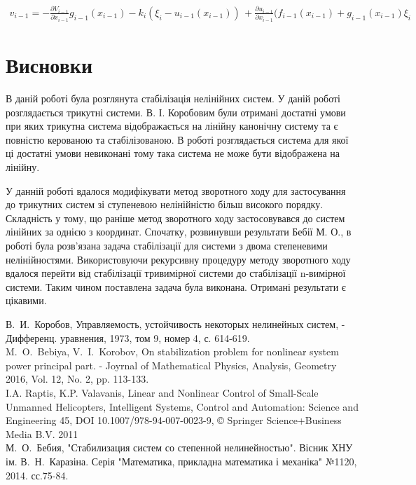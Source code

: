 \documentclass{article}
\begin{document}
\begin{eqnarray}
    v_{i-1}=-{\frac  {\partial V_{{i-1}}}{\partial x_{{i-1}}}}g_{{i-1}}(x_{{i-1}})-k_{i}\left(\xi_{i}-u_{{i-1}}(x_{{i-1}})\right)\,
    +{\frac  {\partial u_{{i-1}}}{\partial x_{{i-1}}}}(f_{{i-1}}(x_{{i-1}})+g_{{i-1}}(x_{{i-1}})\xi_{i}
\end{eqnarray}


\pagebreak
\section{Висновки}
В даній роботі була розглянута стабілізація нелінійних систем.  У даній роботі розглядається трикутні системи.
В. І. Коробовим були отримані достатні умови при яких трикутна система відображається на лінійну канонічну систему та є повністю керованою та стабілізованою. В роботі розглядається система для якої ці
достатні умови невиконані тому така система не може бути відображена на лінійну.


У данній роботі вдалося модифікувати метод зворотного ходу для застосування до 
трикутних систем зі ступеневою нелінійністю більш високого порядку. 
Складність у тому, що раніше метод зворотного ходу застосовувався до систем лінійних за однією з координат.
Спочатку, розвинувши результати Бебії М. О., в роботі була розв'язана  задача стабілізації 
для системи з двома степеневими нелінійностями. 
Використовуючи рекурсивну процедуру методу зворотного ходу  вдалося перейти  від 
стабілізації  тривимірної системи  до стабілізації n-вимірної системи. Таким чином поставлена 
задача була виконана. Отримані результати є цікавими.



\pagebreak
\begin{thebibliography}{}
    В.~И.~Коробов, Управляемость, устойчивость некоторых нелинейных систем, 
    -  Дифференц. уравнения, 1973, том 9, номер 4, с. 614-619.\\
    M.~O.~Bebiya, V.~I.~Korobov, On stabilization problem for nonlinear system power principal part. 
    - Joyrnal of Mathematical Physics, Analysis, Geometry 2016, Vol. 12, No. 2, pp. 113-133.\\
    I.A. Raptis, K.P. Valavanis, Linear and Nonlinear Control of Small-Scale Unmanned Helicopters, 
    Intelligent Systems, Control and Automation: Science and Engineering 45, 
    DOI 10.1007/978-94-007-0023-9, © Springer Science+Business Media B.V. 2011\\
    М.~О.~Бебия, "Стабилизация систем со степенной нелинейностью". Вісник ХНУ ім. В.~Н.~Каразіна. 
    Серія "Математика, прикладна математика і механіка" №1120, 2014. сс.75-84.\\
\end{thebibliography}
\end{document}
